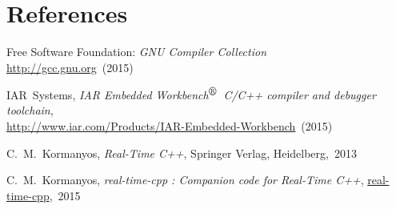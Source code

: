 \documentclass[11pt]{article}
\def\trademarksymbolr   {$^{\mbox{\textregistered}}$}
\begin{document}
\section{References}
\renewcommand{\section}[2]{}%
\begin{thebibliography}{9}


Free Software Foundation: \emph{GNU Compiler Collection}\\
\url{http://gcc.gnu.org}~(2015)

IAR~Systems, \emph{IAR Embedded Workbench\trademarksymbolr\
C/C++ compiler and debugger toolchain},\\
\url{http://www.iar.com/Products/IAR-Embedded-Workbench}~(2015)

C.~M.~Kormanyos, \emph{Real-Time C++},
Springer Verlag, Heidelberg,~2013

C.~M.~Kormanyos, \emph{real-time-cpp : Companion code for Real-Time C++},
{\href{https://github.com/ckormanyos/real-time-cpp}{real-time-cpp}},~2015


\end{thebibliography}
\end{document}
